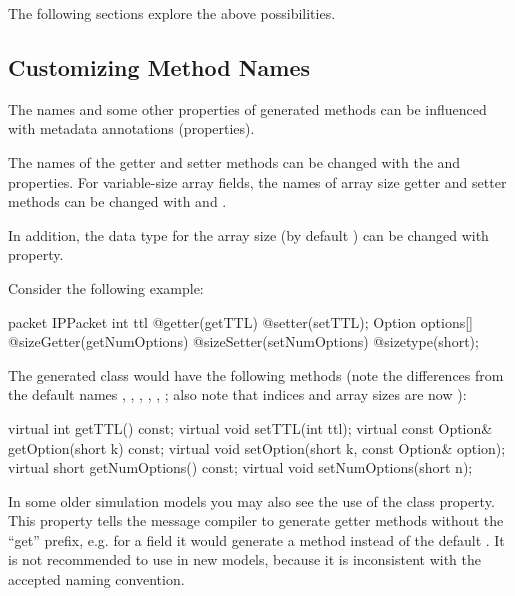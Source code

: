 The following sections explore the above possibilities.


\subsection{Customizing Method Names}
\label{sec:msg-defs:customizing-method-names}

The names and some other properties of generated methods can be influenced
with metadata annotations (properties).

The names of the getter and setter methods can be changed with the
 and  properties. For variable-size array
fields, the names of array size getter and setter methods can be changed
with  and .

In addition, the data type for the array size (by default ) can be changed with  property.

Consider the following example:

\begin{msg}
packet IPPacket {
    int ttl @getter(getTTL) @setter(setTTL);
    Option options[] @sizeGetter(getNumOptions)
                     @sizeSetter(setNumOptions)
                     @sizetype(short);
}
\end{msg}

The generated class would have the following methods (note the differences
from the default names , , ,
, , ;
also note that indices and array sizes are now ):

\begin{cpp}
virtual int getTTL() const;
virtual void setTTL(int ttl);
virtual const Option& getOption(short k) const;
virtual void setOption(short k, const Option& option);
virtual short getNumOptions() const;
virtual void setNumOptions(short n);
\end{cpp}

In some older simulation models you may also see the use of the
 class property. This property tells the message
compiler to generate getter methods without the ``get'' prefix, e.g. for a
 field it would generate a  method
instead of the default . It is not recommended to
use  in new models, because it is inconsistent with the
accepted naming convention.

